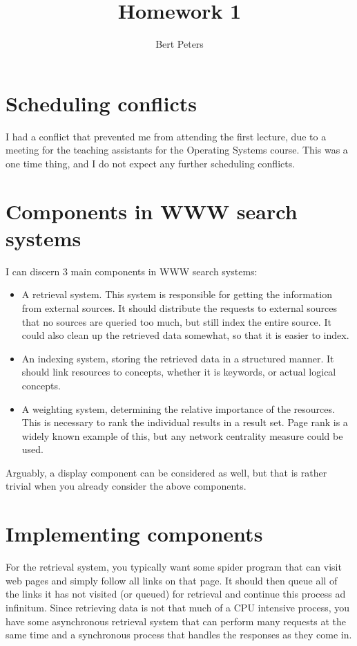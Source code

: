 \documentclass[12pt,a4paper]{article}
\author{Bert Peters}
\title{Homework 1}
\begin{document}
\maketitle

\section{Scheduling conflicts}

I had a conflict that prevented me from attending the first lecture, due to a meeting for the teaching assistants for the Operating Systems course. This was a one time thing, and I do not expect any further scheduling conflicts.

\section{Components in WWW search systems}

I can discern 3 main components in WWW search systems:

\begin{itemize}

\item A retrieval system. This system is responsible for getting the information from external sources. It should distribute the requests to external sources that no sources are queried too much, but still index the entire source. It could also clean up the retrieved data somewhat, so that it is easier to index.

\item An indexing system, storing the retrieved data in a structured manner. It should link resources to concepts, whether it is keywords, or actual logical concepts. 

\item A weighting system, determining the relative importance of the resources. This is necessary to rank the individual results in a result set. Page rank is a widely known example of this, but any network centrality measure could be used.
\end{itemize}

Arguably, a display component can be considered as well, but that is rather trivial when you already consider the above components.

\section{Implementing components}

For the retrieval system, you typically want some spider program that can visit web pages and simply follow all links on that page. It should then queue all of the links it has not visited (or queued) for retrieval and continue this process ad infinitum. Since retrieving data is not that much of a CPU intensive process, you have some asynchronous retrieval system that can perform many requests at the same time and a synchronous process that handles the responses as they come in.
\end{document}
